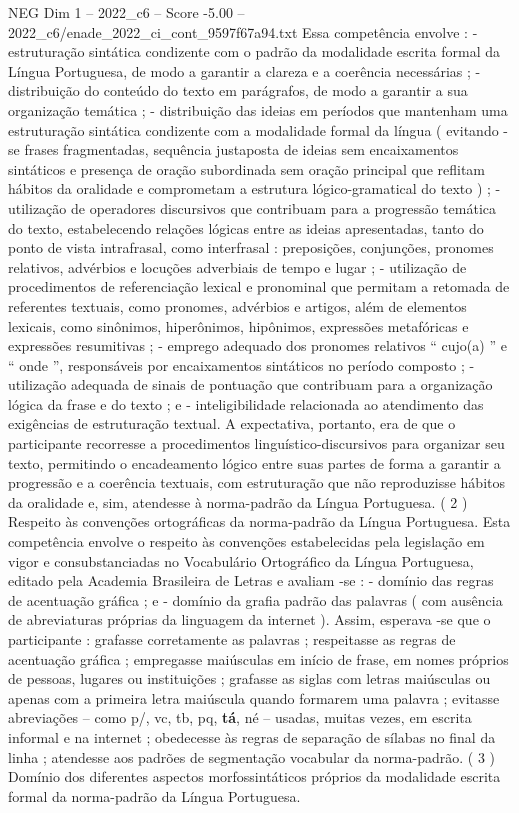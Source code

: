\begin{textsample}{NEG Dim 1 – 2022\_c6 – Score -5.00 – 2022\_c6/enade\_2022\_ci\_cont\_9597f67a94.txt}
Essa competência envolve : - estruturação sintática condizente com o padrão da modalidade escrita formal da Língua Portuguesa, de modo a garantir a clareza e a coerência necessárias ; - distribuição do conteúdo do texto em parágrafos, de modo a garantir a sua organização temática ; - distribuição das ideias em períodos que mantenham uma estruturação sintática condizente com a modalidade formal da língua ( evitando -se frases fragmentadas, sequência justaposta de ideias sem encaixamentos sintáticos e presença de oração subordinada sem oração principal que reflitam hábitos da oralidade e comprometam a estrutura lógico-gramatical do texto ) ; - utilização de operadores discursivos que contribuam para a progressão temática do texto, estabelecendo relações lógicas entre as ideias apresentadas, tanto do ponto de vista intrafrasal, como interfrasal : preposições, conjunções, pronomes relativos, advérbios e locuções adverbiais de tempo e lugar ; - utilização de procedimentos de referenciação lexical e pronominal que permitam a retomada de referentes textuais, como pronomes, advérbios e artigos, além de elementos lexicais, como sinônimos, hiperônimos, hipônimos, expressões metafóricas e expressões resumitivas ; - emprego adequado dos pronomes relativos “ cujo(a) ” e “ onde ”, responsáveis por encaixamentos sintáticos no período composto ; - utilização adequada de sinais de pontuação que contribuam para a organização lógica da frase e do texto ; e - inteligibilidade relacionada ao atendimento das exigências de estruturação textual.
A expectativa, portanto, era de que o participante recorresse a procedimentos linguístico-discursivos para organizar seu texto, permitindo o encadeamento lógico entre suas partes de forma a garantir a progressão e a coerência textuais, com estruturação que não reproduzisse hábitos da oralidade e, sim, atendesse à norma-padrão da Língua Portuguesa. ( 2 ) Respeito às convenções ortográficas da norma-padrão da Língua Portuguesa.
Esta competência envolve o respeito às convenções estabelecidas pela legislação em vigor e consubstanciadas no Vocabulário Ortográfico da Língua Portuguesa, editado pela Academia Brasileira de Letras e avaliam -se : - domínio das regras de acentuação gráfica ; e - domínio da grafia padrão das palavras ( com ausência de abreviaturas próprias da linguagem da internet ).
Assim, esperava -se que o participante : grafasse corretamente as palavras ; respeitasse as regras de acentuação gráfica ; empregasse maiúsculas em início de frase, em nomes próprios de pessoas, lugares ou instituições ; grafasse as siglas com letras maiúsculas ou apenas com a primeira letra maiúscula quando formarem uma palavra ; evitasse abreviações – como p/, vc, tb, pq, \textbf{tá}, né – usadas, muitas vezes, em escrita informal e na internet ; obedecesse às regras de separação de sílabas no final da linha ; atendesse aos padrões de segmentação vocabular da norma-padrão. ( 3 ) Domínio dos diferentes aspectos morfossintáticos próprios da modalidade escrita formal da norma-padrão da Língua Portuguesa.

\end{textsample}
